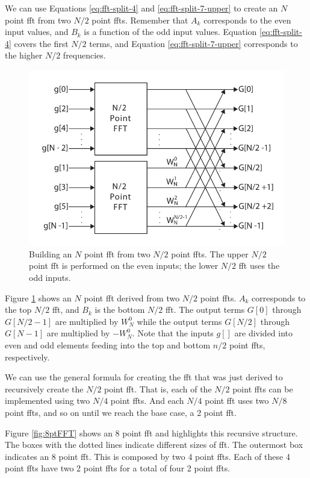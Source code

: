We can use Equations \ref{eq:fft-split-4} and \ref{eq:fft-split-7-upper} to create an $N$ point \gls{fft} from two $N/2$ point \gls{fft}s. Remember that $A_k$ corresponds to the even input values, and $B_k$ is a function of the odd input values. Equation \ref{eq:fft-split-4} covers the first $N/2$ terms, and Equation \ref{eq:fft-split-7-upper} corresponds to the higher $N/2$ frequencies. 

\begin{figure}
\centering
\includegraphics[width=  .8 \textwidth]{images/NptFFT}
\caption{Building an $N$ point \gls{fft} from two $N/2$ point \gls{fft}s. The upper $N/2$ point \gls{fft} is performed on the even inputs; the lower $N/2$ \gls{fft} uses the odd inputs. }
\label{fig:NptFFT}
\end{figure}

Figure \ref{fig:NptFFT} shows an $N$ point \gls{fft} derived from two $N/2$ point \gls{fft}s. $A_k$ corresponds to the top $N/2$ \gls{fft}, and $B_k$ is the bottom $N/2$ \gls{fft}.  The output terms $G[0]$ through $G[N/2-1]$ are multiplied by $W_N^0$ while the output terms $G[N/2]$ through $G[N-1]$ are multiplied by $-W_N^0$. Note that the inputs $g[]$ are divided into even and odd elements feeding into the top and bottom $n/2$ point \gls{fft}s, respectively.

We can use the general formula for creating the \gls{fft} that was just derived to recursively create the $N/2$ point \gls{fft}. That is, each of the $N/2$ point \gls{fft}s can be implemented using two $N/4$ point \gls{fft}s. And each $N/4$ point \gls{fft} uses two $N/8$ point \gls{fft}s, and so on until we reach the base case, a 2 point \gls{fft}.

Figure \ref{fig:8ptFFT} shows an 8 point \gls{fft} and highlights this recursive structure. The boxes with the dotted lines indicate different sizes of \gls{fft}. The outermost box indicates an 8 point \gls{fft}. This is composed by two 4 point \gls{fft}s. Each of these 4 point \gls{fft}s have two 2 point \gls{fft}s for a total of four 2 point \gls{fft}s. 

